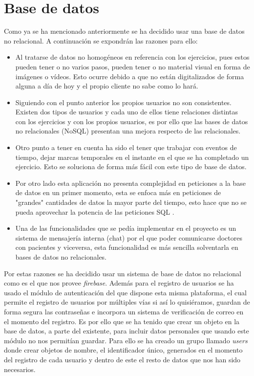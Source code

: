 \section{Base de datos}
Como ya se ha mencionado anteriormente se ha decidido usar una base
de datos no relacional. A continuación se expondrán las razones
para ello:

\begin{itemize}
    \item Al tratarse de datos no homogéneos en referencia con los
    ejercicios, pues estos pueden tener o no varios pasos, pueden
    tener o no material visual en forma de imágenes o vídeos. Esto
    ocurre debido a que no están digitalizados de forma alguna a día
    de hoy y el propio cliente no sabe como lo hará.
    \item Siguiendo con el punto anterior los propios usuarios
    no son consistentes. Existen dos tipos de usuarios y cada
    uno de ellos tiene relaciones distintas
    con los ejercicios y con los propios usuarios, es por ello que
    las bases de datos no relacionales (NoSQL) presentan una mejora
    respecto de las relacionales.
    \item Otro punto a tener en cuenta ha sido el tener que trabajar
    con eventos de tiempo, dejar marcas temporales en el instante en
    el que se ha completado un ejercicio. Esto se soluciona de forma
    más fácil con este tipo de base de datos.
    \item Por otro lado esta aplicación no presenta complejidad en
    peticiones a la base de datos en un primer momento, esta se
    enfoca más en peticiones de "grandes" cantidades de datos la
    mayor parte del tiempo, esto hace que no se pueda aprovechar la
    potencia de las peticiones SQL \cite{sql}.
    \item Una de las funcionalidades que se pedía implementar en el
    proyecto es un sistema de mensajería interna (chat) por el que
    poder comunicarse doctores con pacientes y viceversa, esta
    funcionalidad es más sencilla solventarla en bases de datos no
    relacionales.
\end{itemize}

\medskip
Por estas razones se ha decidido usar un sistema de base de datos
no relacional como es el que nos provee \textit{firebase}. Además
para el registro de usuarios se ha usado el módulo de autenticación
del que dispone esta misma plataforma, el cual permite el registro
de usuarios por múltiples vías si así lo quisiéramos, guardan de
forma segura las contraseñas e incorpora un sistema de verificación
de correo en el momento del registro. Es por ello que se ha tenido
que crear un objeto en la base de datos, a parte del existente,
para incluir datos personales que usando este módulo no nos permitían
guardar. Para ello se ha creado un grupo llamado \textit{users} donde
crear objetos de nombre, el identificador único, generados en el
momento del registro de cada usuario y dentro de este el resto de
datos que nos han sido necesarios.


